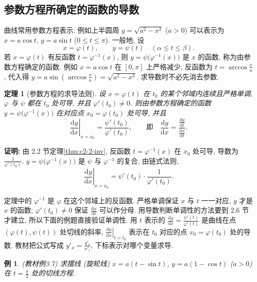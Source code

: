 \documentclass[UTF8,openany]{ctexbook}
\theoremstyle{chinesetextbook}
\newtheorem{example}{例}[section]
\newenvironment{cnproof}{\par\indent\textbf{证明:} \ignorespaces}{\par}
\newtheorem*{theoremsingle}{定理}
\newcommand{\dd}{\mathrm d}
\begin{document}
\subsection{参数方程所确定的函数的导数}
曲线常用参数方程表示. 例如上半圆周 $y=\sqrt{a^2-x^2}$ ($a>0$) 可以表示为 $x=a\cos t$, $y=a\sin t$ ($0\le t\le\pi$). 一般地, 设
\[
x=\varphi(t),\qquad y=\psi(t)\quad(\alpha\le t\le\beta).
\]
若 $x=\varphi(t)$ 有反函数 $t=\varphi^{-1}(x)$, 则 $y=\psi\bigl(\varphi^{-1}(x)\bigr)$ 是 $x$ 的函数, 称为由参数方程确定的函数. 例如 $x=a\cos t$ 在 $[0,\pi]$ 上严格减少, 反函数为 $\displaystyle t=\arccos\frac xa$, 代入得 $\displaystyle y=a\sin\left(\arccos\frac xa\right)=\sqrt{a^2-x^2}$. 求导数时不必先消去参数.
\begin{theoremsingle}[参数方程的求导法则]
设 $x=\varphi(t)$ 在 $t_0$ 的某个邻域内连续且严格单调, $\varphi$ 与 $\psi$ 都在 $t_0$ 处可导, 并且 $\varphi'(t_0)\ne0$. 则由参数方程确定的函数 $y=\psi\bigl(\varphi^{-1}(x)\bigr)$ 在对应点 $x_0=\varphi(t_0)$ 处可导, 并且
\[
\left.\frac{\dd y}{\dd x}\right|_{x=x_0}=\frac{\psi'(t_0)}{\varphi'(t_0)},\qquad\text{即}\quad\frac{\dd y}{\dd x}=\frac{\frac{\dd y}{\dd t}}{\frac{\dd x}{\dd t}}.
\]
\end{theoremsingle}
\begin{cnproof}
由 2.2 节定理\ref{thm:c2-2-inv}, 反函数 $t=\varphi^{-1}(x)$ 在 $x_0$ 处可导, 导数为 $\displaystyle\frac1{\varphi'(t_0)}$. $y=\psi\bigl(\varphi^{-1}(x)\bigr)$ 是 $\psi$ 与 $\varphi^{-1}$ 的复合, 由链式法则,
\[
\left.\frac{\dd y}{\dd x}\right|_{x=x_0}=\psi'(t_0)\cdot\frac1{\varphi'(t_0)}.
\]
\end{cnproof}
定理中的 $\varphi^{-1}$ 是 $\varphi$ 在这个邻域上的反函数. 严格单调保证 $x$ 与 $t$ 一一对应, $y$ 才是 $x$ 的函数; $\varphi'(t_0)\ne0$ 保证 $\displaystyle\frac{\dd x}{\dd t}$ 可以作分母. 用导数判断单调性的方法要到 2.6 节才建立, 所以下面的例题直接验证单调性. 用 $t$ 表示的 $\displaystyle\frac{\dd y}{\dd x}=\frac{\psi'(t)}{\varphi'(t)}$ 是曲线在点 $(\varphi(t),\psi(t))$ 处切线的斜率, $\displaystyle\left.\frac{\dd y}{\dd x}\right|_{t=t_0}$ 表示在 $t_0$ 对应的点 $x_0=\varphi(t_0)$ 处的导数. 教材把公式写成 $\displaystyle y'_x=\frac{y'_t}{x'_t}$, 下标表示对哪个变量求导.
\begin{example}\label{ex:c2-3-7}
\textnormal{(教材例3.7)} 求摆线 (旋轮线) $x=a(t-\sin t)$, $y=a(1-\cos t)$ ($a>0$) 在 $\displaystyle t=\frac\pi2$ 处的切线方程.
\end{example}
\end{document}
